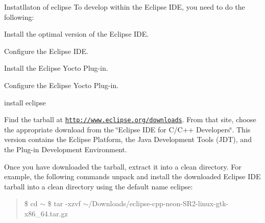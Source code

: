 \begin{DoxyItemize}
\item Instatllaton of eclipse To develop within the Eclipse I\+DE, you need to do the following\+:
\begin{DoxyItemize}
\item Install the optimal version of the Eclipse I\+DE.
\item Configure the Eclipse I\+DE.
\item Install the Eclipse Yocto Plug-\/in.
\item Configure the Eclipse Yocto Plug-\/in.
\end{DoxyItemize}
\item install eclipse
\begin{DoxyItemize}
\item Find the tarball at \href{http://www.eclipse.org/downloads}{\tt http\+://www.\+eclipse.\+org/downloads}. From that site, choose the appropriate download from the \char`\"{}\+Eclipse I\+D\+E for C/\+C++ Developers\char`\"{}. This version contains the Eclipse Platform, the Java Development Tools (J\+DT), and the Plug-\/in Development Environment.
\item Once you have downloaded the tarball, extract it into a clean directory. For example, the following commands unpack and install the downloaded Eclipse I\+DE tarball into a clean directory using the default name eclipse\+: \begin{quote}
\$ cd $\sim$ \$ tar -\/xzvf $\sim$/\+Downloads/eclipse-\/cpp-\/neon-\/\+S\+R2-\/linux-\/gtk-\/x86\+\_\+64.tar.\+gz \end{quote}


\end{DoxyItemize}
\end{DoxyItemize}
